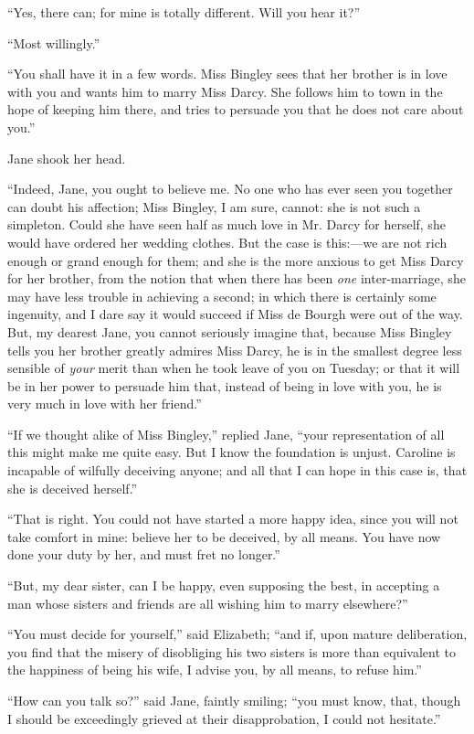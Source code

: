 \documentclass[12pt,openright]{book}
\begin{document}
“Yes, there can; for mine is totally different. Will you hear it?”

“Most willingly.”

“You shall have it in a few words. Miss Bingley sees that her brother is in love with you and wants him to marry Miss Darcy. She follows him to town in the hope of keeping him there, and tries to persuade you that he does not care about you.”

Jane shook her head.

“Indeed, Jane, you ought to believe me. No one who has ever seen you together can doubt his affection; Miss Bingley, I am sure, cannot: she is not such a simpleton. Could she have seen half as much love in Mr. Darcy for herself, she would have ordered her wedding clothes. But the case is this:—we are not rich enough or grand enough for them; and she is the more anxious to get Miss Darcy for her brother, from the notion that when there has been \textit{one} inter-marriage, she may have less trouble in achieving a second; in which there is certainly some ingenuity, and I dare say it would succeed if Miss de Bourgh were out of the way. But, my dearest Jane, you cannot seriously imagine that, because Miss Bingley tells you her brother greatly admires Miss Darcy, he is in the smallest degree less sensible of \textit{your} merit than when he took leave of you on Tuesday; or that it will be in her power to persuade him that, instead of being in love with you, he is very much in love with her friend.”

“If we thought alike of Miss Bingley,” replied Jane, “your representation of all this might make me quite easy. But I know the foundation is unjust. Caroline is incapable of wilfully deceiving anyone; and all that I can hope in this case is, that she is deceived herself.”

“That is right. You could not have started a more happy idea, since you will not take comfort in mine: believe her to be deceived, by all means. You have now done your duty by her, and must fret no longer.”

“But, my dear sister, can I be happy, even supposing the best, in accepting a man whose sisters and friends are all wishing him to marry elsewhere?”

“You must decide for yourself,” said Elizabeth; “and if, upon mature deliberation, you find that the misery of disobliging his two sisters is more than equivalent to the happiness of being his wife, I advise you, by all means, to refuse him.”

“How can you talk so?” said Jane, faintly smiling; “you must know, that, though I should be exceedingly grieved at their disapprobation, I could not hesitate.”
\end{document}
